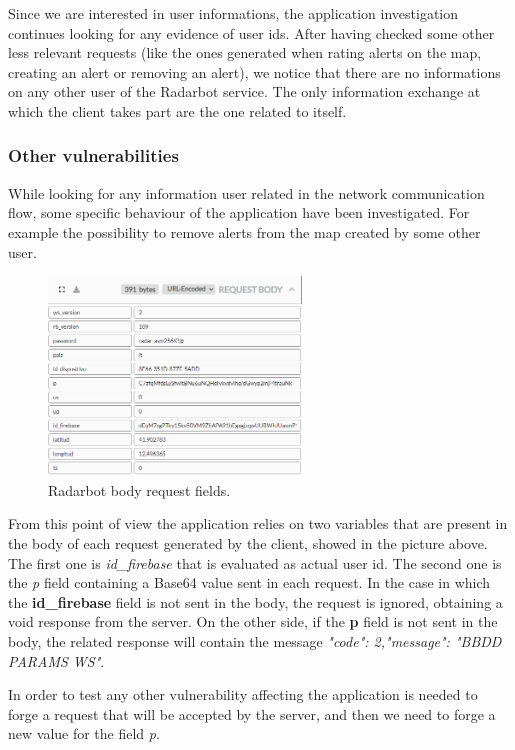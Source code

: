 			\par Since we are interested in user informations, the application investigation continues looking for any evidence of user ids. After having checked some other less relevant requests (like the ones generated when rating alerts on the map, creating an alert or removing an alert), we notice that there are no informations on any other user of the Radarbot service. The only information exchange at which the client takes part are the one related to itself.
		
		\subsubsection{Other vulnerabilities}
		\par While looking for any information user related in the network communication flow, some specific behaviour of the application have been investigated. For example the possibility to remove alerts from the map created by some other user. \newline
		\begin{figure}[H]
			\centering
			\includegraphics[width=0.6\textwidth]{images/radarbot_request.png}
			\caption{Radarbot body request fields.}
		\end{figure}
		\par From this point of view the application relies on two variables that are present in the body of each request generated by the client, showed in the picture above. The first one is \textit{id\_firebase} that is evaluated as actual user id. The second one is the \textit{p} field containing a Base64 value sent in each request. \newline
		In the case in which the \textbf{id\_firebase} field is not sent in the body, the request is ignored, obtaining a void response from the server. \newline
		On the other side, if the \textbf{p} field is not sent in the body, the related response will contain the message \textit{"code": 2,"message": "BBDD PARAMS WS"}. \newline
		\par In order to test any other vulnerability affecting the application is needed to forge a request that will be accepted by the server, and then we need to forge a new value for the field \textit{p}.
		
